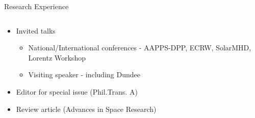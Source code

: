 \documentclass[10pt,aspectratio=169,usenames,dvipsnames]{beamer}
\begin{document}
\begin{frame}{Research Experience}
\begin{columns}
\begin{column}{0.5\textwidth}
\begin{itemize}
\begin{itemize}
    \end{itemize}
    \item Invited talks \begin{itemize}
        \item National/International conferences - AAPPS-DPP, ECRW, SolarMHD, Lorentz Workshop
        \item Visiting speaker - including Dundee
    \end{itemize}
    \item Editor for special issue (Phil.Trans. A)
    \item Review article (Advances in Space Research)
\end{itemize}
\end{column}
\end{columns}
\end{frame}
\end{document}
